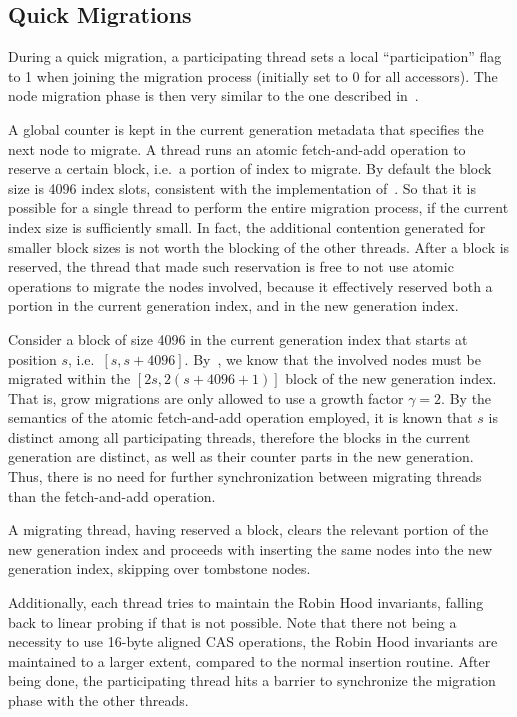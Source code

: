 \subsection{Quick Migrations}\label{subsec:quick-migrations}

During a quick migration, a participating thread sets a local ``participation'' flag to 1 when joining the migration process (initially set to 0 for all accessors).
The node migration phase is then very similar to the one described in~\cite[\S5.3.1]{maier}.

A global counter is kept in the current generation metadata that specifies the next node to migrate.
A thread runs an atomic fetch-and-add operation to reserve a certain block, i.e.\ a portion of index to migrate.
By default the block size is 4096 index slots, consistent with the implementation of~\cite{maier}.
So that it is possible for a single thread to perform the entire migration process, if the current index size is sufficiently small.
In fact, the additional contention generated for smaller block sizes is not worth the blocking of the other threads.
After a block is reserved, the thread that made such reservation is free to not use atomic operations to migrate the nodes involved, because it effectively reserved both a portion in the current generation index, and in the new generation index.

Consider a block of size 4096 in the current generation index that starts at position $s$, i.e.\ $[s, s + 4096]$.
By~\cite[Lemma~5.1]{maier}, we know that the involved nodes must be migrated within the $[2s, 2(s + 4096 + 1)]$ block of the new generation index.
That is, grow migrations are only allowed to use a growth factor $\gamma = 2$.
By the semantics of the atomic fetch-and-add operation employed, it is known that $s$ is distinct among all participating threads, therefore the blocks in the current generation are distinct, as well as their counter parts in the new generation.
Thus, there is no need for further synchronization between migrating threads than the fetch-and-add operation.

A migrating thread, having reserved a block, clears the relevant portion of the new generation index and proceeds with inserting the same nodes into the new generation index, skipping over tombstone nodes.

Additionally, each thread tries to maintain the Robin Hood invariants, falling back to linear probing if that is not possible.
Note that there not being a necessity to use 16-byte aligned CAS operations, the Robin Hood invariants are maintained to a larger extent, compared to the normal insertion routine.
After being done, the participating thread hits a barrier to synchronize the migration phase with the other threads.


